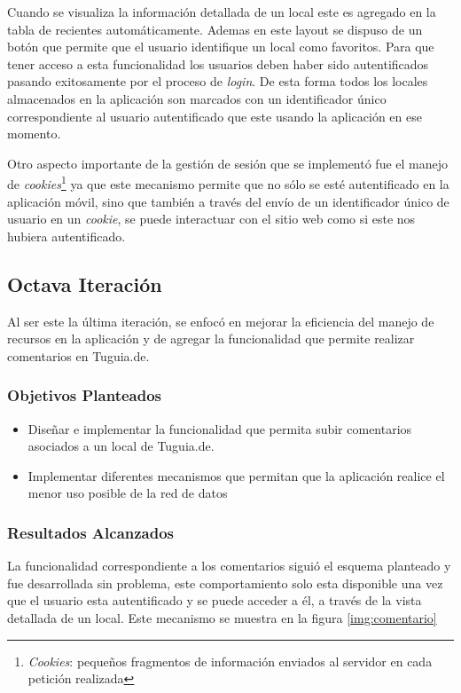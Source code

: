Cuando se visualiza la información detallada de un local este es agregado en la tabla de recientes automáticamente. Ademas en este layout se dispuso de un botón que permite que el usuario identifique un local como favoritos. Para que tener acceso a esta funcionalidad los usuarios deben haber sido autentificados pasando exitosamente por el proceso de \textit{login}. De esta forma todos los locales almacenados en la aplicación son marcados con un identificador único correspondiente al usuario autentificado que este usando la aplicación en ese momento. 

Otro aspecto importante de la gestión de sesión que se implementó fue el manejo de \textit{cookies}\footnote{\textit{Cookies}: pequeños fragmentos de información enviados al servidor en cada petición realizada} ya que este mecanismo permite que no sólo se esté autentificado en la aplicación móvil, sino que también a través del envío de un identificador único de usuario en un \textit{cookie}, se puede interactuar con el sitio web como si este nos hubiera autentificado.

\subsection{Octava Iteración}

Al ser este la última iteración, se enfocó en mejorar la eficiencia del manejo de recursos en la aplicación y de agregar la funcionalidad que permite realizar comentarios en Tuguia.de.

\subsubsection{Objetivos Planteados} 

\begin{itemize}
\item Diseñar e implementar la funcionalidad que permita subir comentarios asociados a un local de Tuguia.de.
\item Implementar diferentes mecanismos que permitan que la aplicación realice el menor uso posible de la red de datos
\end{itemize}

\subsubsection{Resultados Alcanzados}

La funcionalidad correspondiente a los comentarios siguió el esquema planteado y fue desarrollada sin problema, este comportamiento solo esta disponible una vez que el usuario esta autentificado y se puede acceder a él, a través de la vista detallada de un local. Este mecanismo se muestra en la figura \ref{img:comentario}

